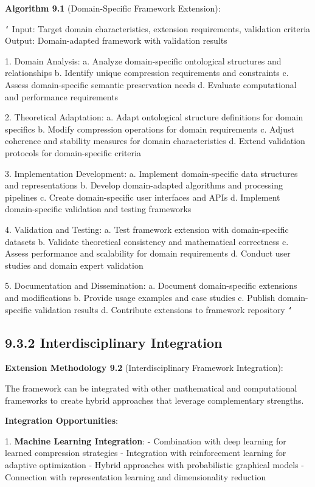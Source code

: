 \textbf{Algorithm 9.1} (Domain-Specific Framework Extension):

\texttt{`}
Input: Target domain characteristics, extension requirements, validation criteria
Output: Domain-adapted framework with validation results

1. Domain Analysis:
   a. Analyze domain-specific ontological structures and relationships
   b. Identify unique compression requirements and constraints
   c. Assess domain-specific semantic preservation needs
   d. Evaluate computational and performance requirements
   
2. Theoretical Adaptation:
   a. Adapt ontological structure definitions for domain specifics
   b. Modify compression operations for domain requirements
   c. Adjust coherence and stability measures for domain characteristics
   d. Extend validation protocols for domain-specific criteria
   
3. Implementation Development:
   a. Implement domain-specific data structures and representations
   b. Develop domain-adapted algorithms and processing pipelines
   c. Create domain-specific user interfaces and APIs
   d. Implement domain-specific validation and testing frameworks
   
4. Validation and Testing:
   a. Test framework extension with domain-specific datasets
   b. Validate theoretical consistency and mathematical correctness
   c. Assess performance and scalability for domain requirements
   d. Conduct user studies and domain expert validation
   
5. Documentation and Dissemination:
   a. Document domain-specific extensions and modifications
   b. Provide usage examples and case studies
   c. Publish domain-specific validation results
   d. Contribute extensions to framework repository
\texttt{`}

\subsection{9.3.2 Interdisciplinary Integration}

\textbf{Extension Methodology 9.2} (Interdisciplinary Framework Integration):

The framework can be integrated with other mathematical and computational frameworks to create hybrid approaches that leverage complementary strengths.

\textbf{Integration Opportunities}:

1. \textbf{Machine Learning Integration}:
   - Combination with deep learning for learned compression strategies
   - Integration with reinforcement learning for adaptive optimization
   - Hybrid approaches with probabilistic graphical models
   - Connection with representation learning and dimensionality reduction

